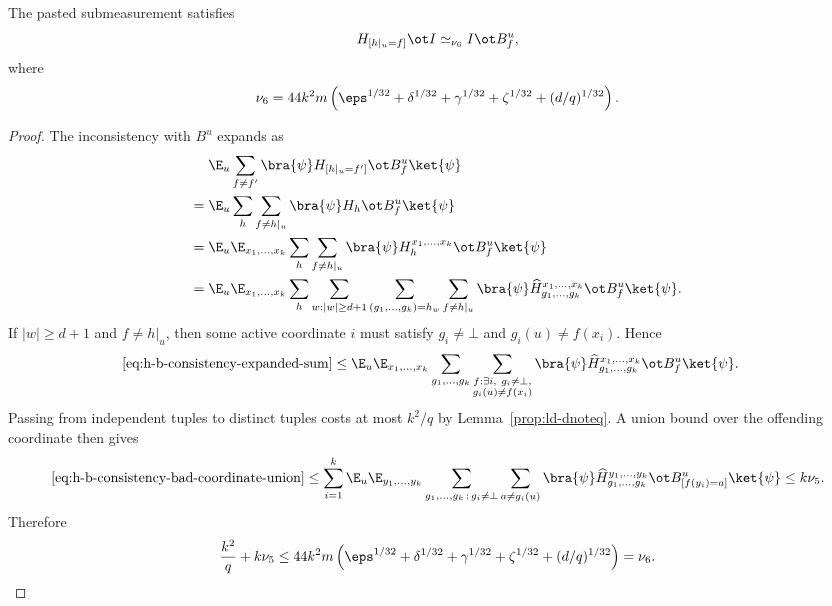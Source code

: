 \begin{lemma}\label{lem:h-b-consistency}
	\leanok
	The pasted submeasurement satisfies
	\[
		H_{[h|_u=f]} \ot I \simeq_{\nu_6} I \ot B_f^u,
	\]
	where
	\[
		\nu_6 = 44k^2m\left(\eps^{1/32}+\delta^{1/32}+\gamma^{1/32}+\zeta^{1/32}+(d/q)^{1/32}\right).
	\]
\end{lemma}
\begin{proof}
	\leanok
	The inconsistency with $B^u$ expands as
	\begin{align}
		    & \E_u \sum_{f\ne f'} \bra{\psi} H_{[h|_u=f']} \ot B_f^u \ket{\psi}\nonumber                                   \\
		={} & \E_u \sum_h \sum_{f\ne h|_u} \bra{\psi} H_h \ot B_f^u \ket{\psi}\nonumber                                    \\
		={} & \E_u \E_{x_1,\dots,x_k} \sum_h \sum_{f\ne h|_u} \bra{\psi} H_h^{x_1,\dots,x_k} \ot B_f^u \ket{\psi}\nonumber \\
		={} & \E_u \E_{x_1,\dots,x_k} \sum_h \sum_{w:|w|\ge d+1} \sum_{(g_1,\dots,g_k)=h_w}
		\sum_{f\ne h|_u}
		\bra{\psi} \widehat H_{g_1,\dots,g_k}^{x_1,\dots,x_k} \ot B_f^u \ket{\psi}.
		\label{eq:h-b-consistency-expanded-sum}
	\end{align}
	If $|w|\ge d+1$ and $f \ne h|_u$, then some active coordinate $i$ must satisfy $g_i \ne \bot$ and $g_i(u)\ne f(x_i)$. Hence
	\begin{align}
		\eqref{eq:h-b-consistency-expanded-sum}
		\le{} &
		\E_u \E_{x_1,\dots,x_k} \sum_{g_1,\dots,g_k}
		\sum_{\substack{f:\exists i,\ g_i\ne\bot, \\ g_i(u)\ne f(x_i)}}
		\bra{\psi} \widehat H_{g_1,\dots,g_k}^{x_1,\dots,x_k} \ot B_f^u \ket{\psi}.
		\label{eq:h-b-consistency-bad-coordinate-union}
	\end{align}
	Passing from independent tuples to distinct tuples costs at most $k^2/q$ by Lemma~\ref{prop:ld-dnoteq}. A union bound over the offending coordinate then gives
	\[
		\eqref{eq:h-b-consistency-bad-coordinate-union}
		\le
		\sum_{i=1}^k
		\E_u \E_{y_1,\dots,y_k}
		\sum_{g_1,\dots,g_k\,:\,g_i\ne\bot}
		\sum_{a\ne g_i(u)}
		\bra{\psi} \widehat H_{g_1,\dots,g_k}^{y_1,\dots,y_k} \ot B_{[f(y_i)=a]}^u \ket{\psi}
		\le k\nu_5.
	\]
	Therefore
	\[
		\frac{k^2}{q} + k\nu_5
		\le
		44k^2m\left(\eps^{1/32}+\delta^{1/32}+\gamma^{1/32}+\zeta^{1/32}+(d/q)^{1/32}\right)
		= \nu_6.
	\]
\end{proof}

